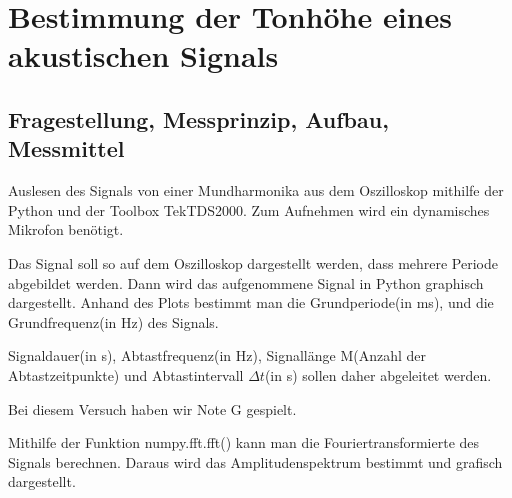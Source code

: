 \documentclass[12pt, oneside, a4paper, \docLanguage]{report}
\begin{document}

\setcounter{section}{0}



\clearpage

%
%


%
%


%
%





\setcounter{page}{1} 
\pagestyle{default}

%
%
\chapter{Bestimmung der Tonhöhe eines akustischen Signals}

\section{Fragestellung, Messprinzip, Aufbau, Messmittel}
\label{chap:VERSUCH_1_FRAGESTELLUNG}

\qquad Auslesen des Signals von einer Mundharmonika aus dem Oszilloskop mithilfe der Python und der Toolbox TekTDS2000. Zum Aufnehmen wird ein dynamisches Mikrofon benötigt.

Das Signal soll so auf dem Oszilloskop dargestellt werden, dass mehrere Periode abgebildet werden. Dann wird das aufgenommene Signal in Python graphisch dargestellt.
Anhand des Plots bestimmt man die Grundperiode(in ms), und die Grundfrequenz(in Hz) des Signals.

Signaldauer(in s), Abtastfrequenz(in Hz), Signallänge M(Anzahl der Abtastzeitpunkte) und Abtastintervall $\Delta{t}$(in s) sollen daher abgeleitet werden.

Bei diesem Versuch haben wir Note G gespielt.

Mithilfe der Funktion numpy.fft.fft() kann man die Fouriertransformierte des Signals berechnen. Daraus wird das Amplitudenspektrum bestimmt und grafisch dargestellt.
\end{document}
